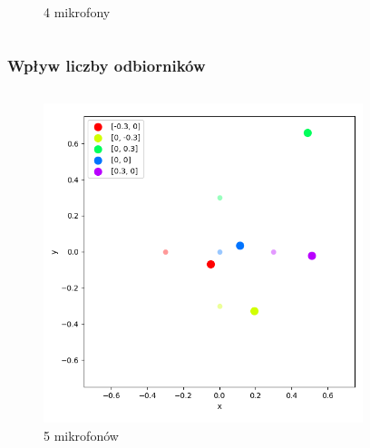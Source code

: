 \begin{frame}{}
\begin{columns}
\begin{column}{0.5\textwidth}
\begin{figure}
                \caption{4 mikrofony}
            \end{figure}
        \end{column}
    \end{columns}
\end{frame}

\begin{frame}{}
    \frametitle{Wpływ liczby odbiorników}
    \begin{columns}
        \begin{column}{0.5\textwidth}
            \begin{figure}
                \centering
                \includegraphics[width=\textwidth]{../pics/mult_lat_2d_num/positions_5_mean.png}
                \caption{5 mikrofonów}
            \end{figure}
        \end{column}
        \begin{column}{0.5\textwidth}
            \begin{figure}
                \centering

\end{figure}
\end{column}
\end{columns}
\end{frame}
